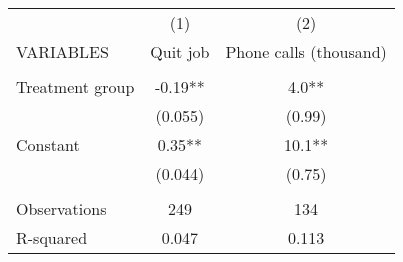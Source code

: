 \begin{tabular}{lcc} \hline
 & (1) & (2) \\
VARIABLES & Quit job & Phone calls (thousand) \\ \hline
 &  &  \\
Treatment group & -0.19** & 4.0** \\
 & (0.055) & (0.99) \\
Constant & 0.35** & 10.1** \\
 & (0.044) & (0.75) \\
 &  &  \\
Observations & 249 & 134 \\
 R-squared & 0.047 & 0.113 \\ \hline
\end{tabular}
